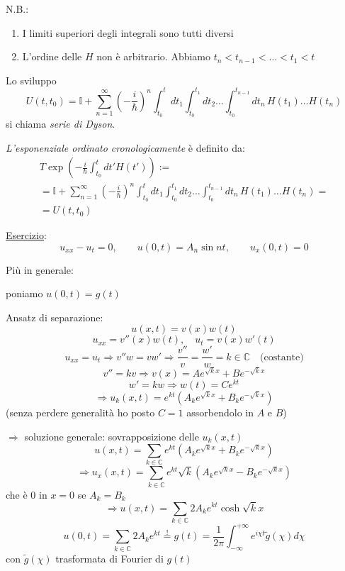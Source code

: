 \documentclass[a4paper,11pt]{report}
\begin{document}
N.B.:\begin{enumerate}
\item I limiti superiori degli integrali sono tutti diversi
\item L'ordine delle $H$ non \`e arbitrario. Abbiamo $t_n<t_{n-1}<\ldots <t_1<t$
\end{enumerate}
Lo sviluppo 
\begin{equation}
U(t,t_0)=\mathbb{I}+\sum_{n=1}^\infty \left(-\frac{i}{\hbar}\right)^n \int_{t_0}^tdt_1 \int_{t_0}^{t_1}dt_2 \ldots \int_{t_0}^{t_{n-1}}dt_n\, H(t_1)\ldots H(t_n)
\end{equation}
si chiama \emph{serie di Dyson}.

\emph{L'esponenziale ordinato cronologicamente} \`e definito da:
\begin{multline}
T\exp\left(-\frac{i}{\hbar}\int_{t_0}^t dt' H(t')\right):=\\
=\mathbb{I}+\sum_{n=1}^\infty \left(-\frac{i}{\hbar}\right)^n \int_{t_0}^tdt_1 \int_{t_0}^{t_1}dt_2 \ldots \int_{t_0}^{t_{n-1}}dt_n\, H(t_1)\ldots H(t_n) =\\
= U(t,t_0)
\label{2.178}
\end{multline}

\medskip

\underline{Esercizio}:
\[
u_{xx}-u_t =0, \qquad u(0,t)=A_n\sin nt ,\qquad u_x(0,t)=0
\]

Pi\`u in generale: 

poniamo $u(0,t)=g(t)$

Ansatz di separazione:
\[
u(x,t)=v(x)w(t)
\]
\[
u_{xx}=v''(x)w(t), \quad u_t=v(x)w'(t)
\]
\[
u_{xx}=u_t \Rightarrow v'' w=vw' \Rightarrow \frac{v''}{v} = \frac{w'}{w} = k \in \mathbb{C}\quad\text{(costante)}
\]
\[
v''=kv \Rightarrow v(x)=Ae^{\sqrt{k}x} + B e^{-\sqrt{k} x}
\]
\[
w'=kw \Rightarrow w(t)=Ce^{kt}
\]
\[
\Rightarrow u_k(x,t)=e^{kt}\left(A_k e^{\sqrt{k} x}  + B_k e^{-\sqrt{k}x}\right)
\]
(senza perdere generalit\`a ho posto $C=1$ assorbendolo in $A$ e $B$)

$ \Rightarrow$ soluzione generale: sovrapposizione delle $u_k(x,t)$
\[
u(x,t)=\sum_{k\in \mathbb{C}} e^{kt}\left(A_k e^{\sqrt{k} x}  + B_k e^{-\sqrt{k}x}\right) 
\]
\[
\Rightarrow u_x(x,t)=\sum_{k\in \mathbb{C}} e^{kt}\sqrt{k}\left(A_k e^{\sqrt{k} x}  - B_k e^{-\sqrt{k}x}\right) 
\]
che \`e 0 in $x=0$ se $A_k = B_k$
\[
\Rightarrow u(x,t)=\sum_{k\in \mathbb{C}} 2A_ke^{kt}\cosh \sqrt{k}x
\]
\[
u(0,t)=\sum_{k\in \mathbb{C}} 2A_ke^{kt}\overset{!}{=}g(t)=\frac{1}{2\pi}\int_{-\infty}^{+\infty}e^{i\chi t} \tilde{g}(\chi)d\chi
\]
con $\tilde{g}(\chi)$ trasformata di Fourier di $g(t)$
\end{document}
